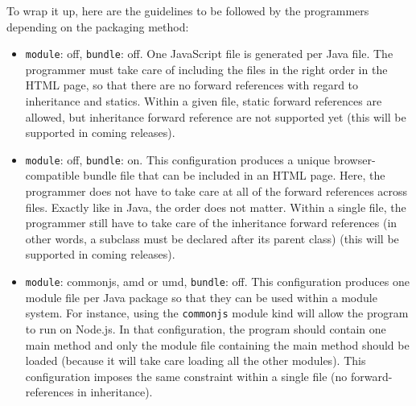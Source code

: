 \documentclass[a4paper]{report}
\begin{document}
To wrap it up, here are the guidelines to be followed by the programmers depending on the packaging method:

\begin{itemize}
\item \texttt{module}: off, \texttt{bundle}: off. One JavaScript file is generated per Java file. The programmer must take care of including the files in the right order in the HTML page, so that there are no forward references with regard to inheritance and statics. Within a given file, static forward references are allowed, but inheritance forward reference are not supported yet (this will be supported in coming releases). 
\item \texttt{module}: off, \texttt{bundle}: on. This configuration produces a unique browser-compatible bundle file that can be included in an HTML page. Here, the programmer does not have to take care at all of the forward references across files. Exactly like in Java, the order does not matter. Within a single file, the programmer still have to take care of the inheritance forward references (in other words, a subclass must be declared after its parent class) (this will be supported in coming releases).
\item \texttt{module}: commonjs, amd or umd, \texttt{bundle}: off. This configuration produces one module file per Java package so that they can be used within a module system. For instance, using the \texttt{commonjs} module kind will allow the program to run on Node.js. In that configuration, the program should contain one main method and only the module file containing the main method should be loaded (because it will take care loading all the other modules). This configuration imposes the same constraint within a single file (no forward-references in inheritance).
\end{itemize}
        
\end{document}
